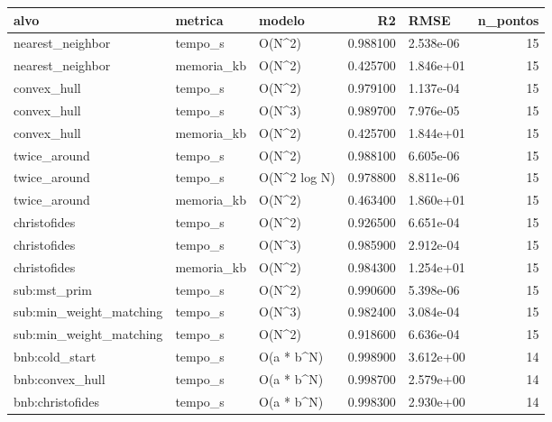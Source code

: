\begin{tabular}{lllrlr}
\toprule
alvo & metrica & modelo & R2 & RMSE & n\_pontos \\
\midrule
nearest\_neighbor & tempo\_s & O(N\textasciicircum 2) & 0.988100 & 2.538e-06 & 15 \\
nearest\_neighbor & memoria\_kb & O(N\textasciicircum 2) & 0.425700 & 1.846e+01 & 15 \\
convex\_hull & tempo\_s & O(N\textasciicircum 2) & 0.979100 & 1.137e-04 & 15 \\
convex\_hull & tempo\_s & O(N\textasciicircum 3) & 0.989700 & 7.976e-05 & 15 \\
convex\_hull & memoria\_kb & O(N\textasciicircum 2) & 0.425700 & 1.844e+01 & 15 \\
twice\_around & tempo\_s & O(N\textasciicircum 2) & 0.988100 & 6.605e-06 & 15 \\
twice\_around & tempo\_s & O(N\textasciicircum 2 log N) & 0.978800 & 8.811e-06 & 15 \\
twice\_around & memoria\_kb & O(N\textasciicircum 2) & 0.463400 & 1.860e+01 & 15 \\
christofides & tempo\_s & O(N\textasciicircum 2) & 0.926500 & 6.651e-04 & 15 \\
christofides & tempo\_s & O(N\textasciicircum 3) & 0.985900 & 2.912e-04 & 15 \\
christofides & memoria\_kb & O(N\textasciicircum 2) & 0.984300 & 1.254e+01 & 15 \\
sub:mst\_prim & tempo\_s & O(N\textasciicircum 2) & 0.990600 & 5.398e-06 & 15 \\
sub:min\_weight\_matching & tempo\_s & O(N\textasciicircum 3) & 0.982400 & 3.084e-04 & 15 \\
sub:min\_weight\_matching & tempo\_s & O(N\textasciicircum 2) & 0.918600 & 6.636e-04 & 15 \\
bnb:cold\_start & tempo\_s & O(a * b\textasciicircum N) & 0.998900 & 3.612e+00 & 14 \\
bnb:convex\_hull & tempo\_s & O(a * b\textasciicircum N) & 0.998700 & 2.579e+00 & 14 \\
bnb:christofides & tempo\_s & O(a * b\textasciicircum N) & 0.998300 & 2.930e+00 & 14 \\
\bottomrule
\end{tabular}
